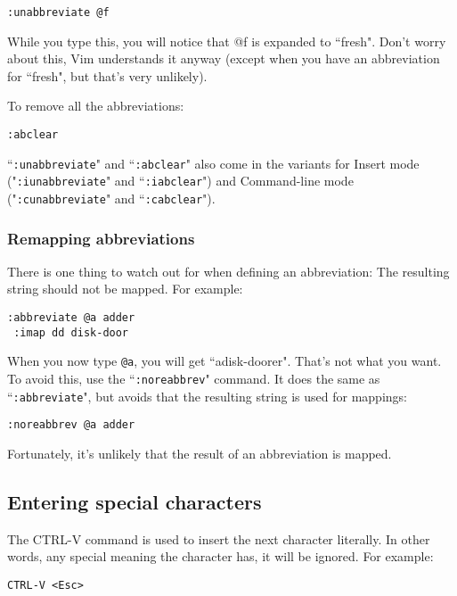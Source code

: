 \begin{Verbatim}[samepage=true]
 :unabbreviate @f
\end{Verbatim}

While you type this, you will notice that @f is expanded to ``fresh".
Don't worry about this, Vim understands it anyway (except when you have an abbreviation for ``fresh", but that's very unlikely).

To remove all the abbreviations:

\begin{Verbatim}[samepage=true]
 :abclear
\end{Verbatim}

``\texttt{:unabbreviate}" and ``\texttt{:abclear}" also come in the variants for Insert mode ("\texttt{:iunabbreviate}" and ``\texttt{:iabclear}") and Command-line mode ("\texttt{:cunabbreviate}" and ``\texttt{:cabclear}").
\subsubsection{Remapping abbreviations}
There is one thing to watch out for when defining an abbreviation: The resulting string should not be mapped.
For example:

\begin{Verbatim}[samepage=true]
 :abbreviate @a adder
 :imap dd disk-door
\end{Verbatim}

When you now type \texttt{@a}, you will get ``adisk-doorer".
That's not what you want.
To avoid this, use the ``\texttt{:noreabbrev}" command.
It does the same as ``\texttt{:abbreviate}", but avoids that the resulting string is used for mappings:

\begin{Verbatim}[samepage=true]
 :noreabbrev @a adder
\end{Verbatim}

Fortunately, it's unlikely that the result of an abbreviation is mapped.
\subsection{Entering special characters}
The CTRL-V command is used to insert the next character literally.
In other words, any special meaning the character has, it will be ignored.
For example:

\begin{Verbatim}[samepage=true]
 CTRL-V <Esc>
\end{Verbatim}

